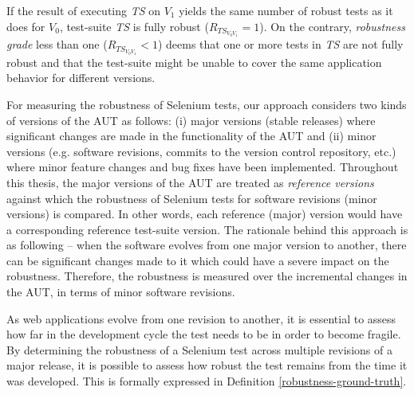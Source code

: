 If the result of executing \textit{TS} on \textit{$V_{1}$} yields the same number of robust tests as it does for \textit{$V_{0}$}, test-suite \textit{TS} is fully robust ($R_{TS_{V_{0}V_{1}}} =1$). On the contrary, \textit{
robustness grade} less than one ($R_{TS_{V_{0}V_{1}}} < 1$) deems that one or more tests in \textit{TS} are not fully robust and that the test-suite might be unable to cover the same application behavior for different versions. 

For measuring the robustness of Selenium tests, our approach considers two kinds of versions of the AUT as follows: (i) major versions (stable releases) where significant changes are made in the functionality of the AUT and (ii) minor versions (e.g. software revisions, commits to the version control repository, etc.) where minor feature changes and bug fixes have been implemented. Throughout this thesis, the major versions of the AUT are treated as \textit{reference versions} against which the robustness of Selenium tests for software revisions (minor versions) is compared. In other words, each reference (major) version would have a corresponding reference test-suite version. 
The rationale behind this approach is as following -- when the software evolves from one major version to another, there can be significant changes made to it which could have a severe impact on the robustness. Therefore, the robustness is measured over the incremental changes in the AUT, in terms of minor software revisions.  


As web applications evolve from one revision to another, it is essential to assess how far in the development cycle the test needs to be in order to become fragile. By determining the robustness of a Selenium test across multiple revisions of a major release, it is possible to assess how robust the test remains from the time it was developed. This is formally expressed in Definition \ref{robustness-ground-truth}. 

\theoremstyle{definition}

